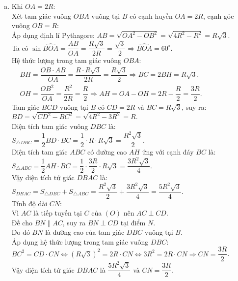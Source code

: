 \begin{bt}
{\begin{enumerate}[a)]
    Do đó $\triangle ODH \sim \triangle OAD$ (c-g-c), suy ra $\widehat{ODH} = \widehat{OAD}$.\\
    Mặt khác, do $OA \parallel BD$ nên hai góc so le trong bằng nhau: $\widehat{ADB} = \widehat{OAD}$.\\
    Từ đó suy ra $\widehat{ODH} = \widehat{ADB}$.
    \item Khi $OA = 2R$:\\
    Xét tam giác vuông $OBA$ vuông tại $B$ có cạnh huyền $OA = 2R$, cạnh góc vuông $OB = R$:\\
    Áp dụng định lí Pythagore:
    $AB = \sqrt{OA^2 - OB^2} = \sqrt{4R^2 - R^2} = R\sqrt{3}$.\\
    Ta có $\sin \widehat{BOA} = \dfrac{AB}{OA} = \dfrac{R\sqrt{3}}{2R} = \dfrac{\sqrt{3}}{2} \Rightarrow \widehat{BOA} = 60^\circ$.\\
    Hệ thức lượng trong tam giác vuông $OBA$:
    $\begin{aligned}
    &BH = \dfrac{OB \cdot AB}{OA} = \dfrac{R \cdot R\sqrt{3}}{2R} = \dfrac{R\sqrt{3}}{2} \Rightarrow BC = 2BH = R\sqrt{3}, \\
    &OH = \dfrac{OB^2}{OA} = \dfrac{R^2}{2R} = \dfrac{R}{2} \Rightarrow AH = OA - OH = 2R - \dfrac{R}{2} = \dfrac{3R}{2}.
    \end{aligned}$\\
    Tam giác $BCD$ vuông tại $B$ có $CD = 2R$ và $BC = R\sqrt{3}$, suy ra:
    $BD = \sqrt{CD^2 - BC^2} = \sqrt{4R^2 - 3R^2} = R$.\\
    Diện tích tam giác vuông $DBC$ là:
    $S_{\triangle DBC} = \dfrac{1}{2}BD \cdot BC = \dfrac{1}{2} \cdot R \cdot R\sqrt{3} = \dfrac{R^2\sqrt{3}}{2}$.\\
    Diện tích tam giác $ABC$ có đường cao $AH$ ứng với cạnh đáy $BC$ là:
    $S_{\triangle ABC} = \dfrac{1}{2}AH \cdot BC = \dfrac{1}{2} \cdot \dfrac{3R}{2} \cdot R\sqrt{3} = \dfrac{3R^2\sqrt{3}}{4}$.\\
    Vậy diện tích tứ giác $DBAC$ là:
    $S_{DBAC} = S_{\triangle DBC} + S_{\triangle ABC} = \dfrac{R^2\sqrt{3}}{2} + \dfrac{3R^2\sqrt{3}}{4} = \dfrac{5R^2\sqrt{3}}{4}$.\\
    Tính độ dài $CN$:\\
    Vì $AC$ là tiếp tuyến tại $C$ của $(O)$ nên $AC \perp CD$.\\
    Đề cho $BN \parallel AC$, suy ra $BN \perp CD$ tại điểm $N$.\\
    Do đó $BN$ là đường cao của tam giác $DBC$ vuông tại $B$.\\
    Áp dụng hệ thức lượng trong tam giác vuông $DBC$:
    $BC^2 = CD \cdot CN \Leftrightarrow (R\sqrt{3})^2 = 2R \cdot CN \Leftrightarrow 3R^2 = 2R \cdot CN \Rightarrow CN = \dfrac{3R}{2}$.\\
    Vậy diện tích tứ giác $DBAC$ là $\dfrac{5R^2\sqrt{3}}{4}$ và $CN = \dfrac{3R}{2}$.
\end{enumerate}
}
\end{bt}
